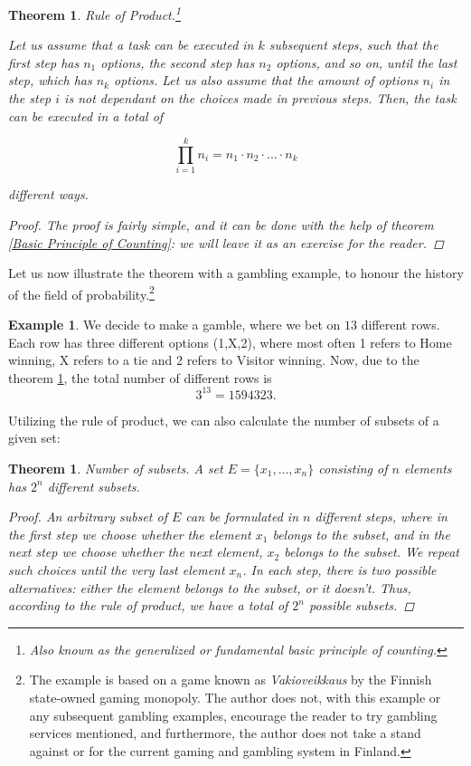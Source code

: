\documentclass[12pt,a4paper,leqno]{report}
\theoremstyle{plain}
\newtheorem{lause}[equation]{Theorem}
\theoremstyle{definition}
\newtheorem{esim}[equation]{Example}
\begin{document}
\begin{lause}\label{thm:ruleofproduct} Rule of Product.\footnote{Also known as the \emph{generalized} or \emph{fundamental basic principle of counting}.} 

Let us assume that a task can be executed in $k$ subsequent steps, such that the first step has $n_1$ options, the second step has $n_2$ options, and so on, until the last step, which has $n_k$ options. Let us also assume that the amount of options $n_i$ in the step $i$ is not dependant on the choices made in previous steps. Then, the task can be executed in a total of

\[
\prod_{i=1}^k n_i =  n_1 \cdot n_2 \cdot ...  \cdot n_k
\]

different ways.
\begin{proof}
The proof is fairly simple, and it can be done with the help of theorem \ref{Basic Principle of Counting}: we will leave it as an exercise for the reader.
\end{proof}
\end{lause}

Let us now illustrate the theorem with a gambling example, to honour the history of the field of probability.\footnote{The example is based on a game known as \emph{Vakioveikkaus} by the Finnish state-owned gaming monopoly. The author does not, with this example or any subsequent gambling examples, encourage the reader to try gambling services mentioned, and furthermore, the author does not take a stand against or for the current gaming and gambling system in Finland.}

\begin{esim}
We decide to make a gamble, where we bet on $13$ different rows. Each row has three different options (1,X,2), where most often 1 refers to Home winning, X refers to a tie and 2 refers to Visitor winning. Now, due to the theorem \ref{thm:ruleofproduct}, the total number of different rows is
\[
3^{13} = 1594323.
\]
\end{esim}

Utilizing the rule of product, we can also calculate the number of subsets of a given set:

\begin{lause}\label{thm:numberofsubsets}
Number of subsets. A set $E = \{x_1, \dots , x_n\}$ consisting of $n$ elements has $2^n$ different subsets.

\begin{proof}
An arbitrary subset of $E$ can be formulated in $n$ different steps, where in the first step we choose whether the element $x_1$ belongs to the subset, and in the next step we choose whether the next element, $x_2$ belongs to the subset. We repeat such choices until the very last element $x_n$. In each step, there is two possible alternatives: either the element belongs to the subset, or it doesn't. Thus, according to the rule of product, we have a total of $2^n$ possible subsets.
\end{proof}
\end{lause}
\end{document}

